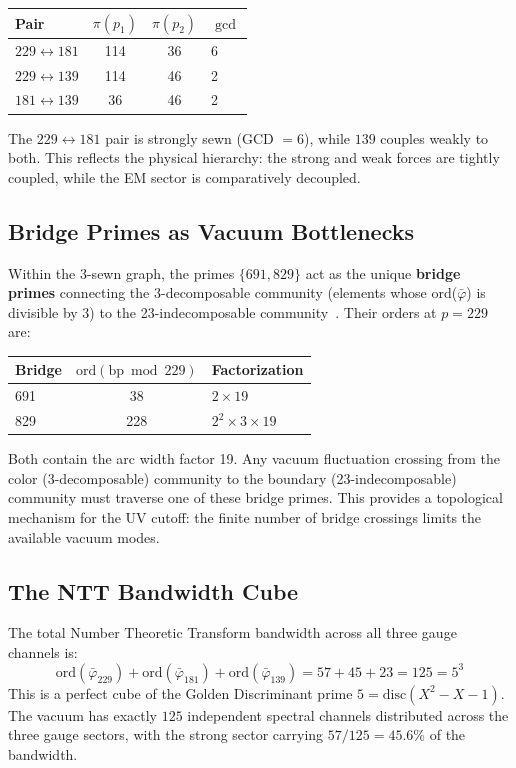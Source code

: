 \begin{center}
\begin{tabular}{lccl}
\hline
\textbf{Pair} & $\pi(p_1)$ & $\pi(p_2)$ & $\gcd$ \\
\hline
$229 \leftrightarrow 181$ & 114 & 36 & 6 \\
$229 \leftrightarrow 139$ & 114 & 46 & 2 \\
$181 \leftrightarrow 139$ & 36  & 46 & 2 \\
\hline
\end{tabular}
\end{center}

The $229 \leftrightarrow 181$ pair is strongly sewn (GCD $= 6$), while $139$ couples weakly to both. This reflects the physical hierarchy: the strong and weak forces are tightly coupled, while the EM sector is comparatively decoupled.

\subsection{Bridge Primes as Vacuum Bottlenecks}

Within the 3-sewn graph, the primes $\{691, 829\}$ act as the unique \textbf{bridge primes} connecting the 3-decomposable community (elements whose ord($\bar\varphi$) is divisible by 3) to the 23-indecomposable community~\cite{watts-strogatz1998, newman2006}. Their orders at $p = 229$ are:
\begin{center}
\begin{tabular}{lcl}
\hline
Bridge & $\text{ord}(\text{bp} \bmod 229)$ & Factorization \\
\hline
691 & 38 & $2 \times 19$ \\
829 & 228 & $2^2 \times 3 \times 19$ \\
\hline
\end{tabular}
\end{center}
Both contain the arc width factor 19. Any vacuum fluctuation crossing from the color (3-decomposable) community to the boundary (23-indecomposable) community must traverse one of these bridge primes. This provides a topological mechanism for the UV cutoff: the finite number of bridge crossings limits the available vacuum modes.

\subsection{The NTT Bandwidth Cube}

The total Number Theoretic Transform bandwidth across all three gauge channels is:
\begin{equation}
    \text{ord}(\bar\varphi_{229}) + \text{ord}(\bar\varphi_{181}) + \text{ord}(\bar\varphi_{139}) = 57 + 45 + 23 = 125 = 5^3
\end{equation}
This is a perfect cube of the Golden Discriminant prime $5 = \text{disc}(X^2 - X - 1)$. The vacuum has exactly $125$ independent spectral channels distributed across the three gauge sectors, with the strong sector carrying $57/125 = 45.6\%$ of the bandwidth.

